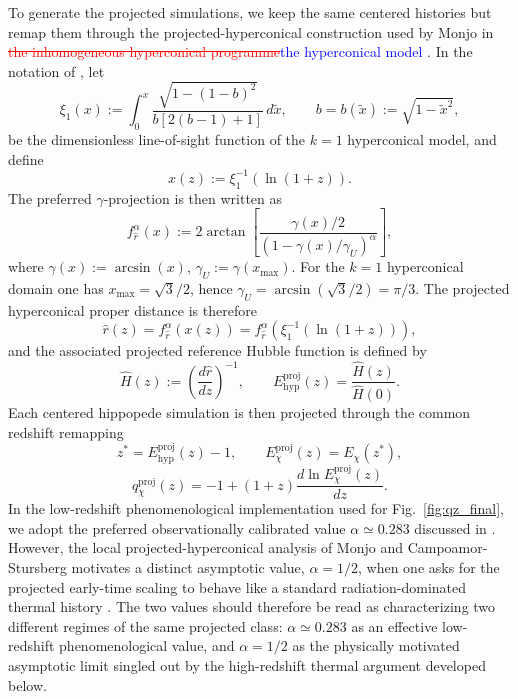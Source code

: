 \documentclass[3p,times,twocolumn]{elsarticle}
\begin{document}
To generate the projected simulations, we keep the same centered histories but remap them through the projected-hyperconical construction used by Monjo in \textcolor{red}{\sout{the inhomogeneous hyperconical programme}}\textcolor{blue}{the hyperconical model} \cite{monjo2017hyperconical, monjo2018projected, monjo2020lagrangian, monjo2023hubble, Monjo_2024}. In the notation of \cite{monjo2018projected}, let
\begin{equation}
\xi_1(x):=\int_{0}^{x}\frac{\sqrt{1-(1-b)^2}}{b\left[2(b-1)+1\right]}\,d\tilde x,
\qquad
b=b(\tilde x):=\sqrt{1-\tilde x^2},
\end{equation}
be the dimensionless line-of-sight function of the $k=1$ hyperconical model, and define
\begin{equation}
x(z):=\xi_1^{-1}(\ln(1+z)).
\end{equation}
The preferred $\gamma$-projection is then written as
\begin{equation}
\label{eq:projection_map}
f_{\hat r}^{\alpha}(x):=
2\arctan\!\left[
\frac{\gamma(x)/2}{\left(1-\gamma(x)/\gamma_U\right)^\alpha}
\right],
\end{equation}
where $\gamma(x):=\arcsin(x)$, $\gamma_U:=\gamma(x_{\max})$. For the $k=1$ hyperconical domain one has $x_{\max}=\sqrt{3}/2$, hence $\gamma_U=\arcsin\!\left(\sqrt{3}/2\right)= \pi/3$. The projected hyperconical proper distance is therefore
\begin{equation}
\hat r(z)= f_{\hat r}^{\alpha}\!\left(x(z)\right)
= f_{\hat r}^{\alpha}\!\left(\xi_1^{-1}(\ln(1+z))\right),
\end{equation}
and the associated projected reference Hubble function is defined by
\begin{equation}
\hat H(z):=\left(\frac{d\hat r}{dz}\right)^{-1},
\qquad
E_{\mathrm{hyp}}^{\mathrm{proj}}(z)=\frac{\hat H(z)}{\hat H(0)}.
\end{equation}
Each centered hippopede simulation is then projected through the common redshift remapping
\begin{equation}
z^*=E_{\mathrm{hyp}}^{\mathrm{proj}}(z)-1,
\qquad
E^{\mathrm{proj}}_\chi(z)=E_\chi(z^*),
\end{equation}
\begin{equation}
q^{\mathrm{proj}}_\chi(z)=-1+(1+z)\frac{d\ln E^{\mathrm{proj}}_\chi(z)}{dz}.
\end{equation}
In the low-redshift phenomenological implementation used for Fig.~\ref{fig:qz_final}, we adopt the preferred observationally calibrated value $\alpha\simeq0.283$ discussed in \cite{monjo2018projected}. However, the local projected-hyperconical analysis of Monjo and Campoamor-Stursberg motivates a distinct asymptotic value, $\alpha=1/2$, when one asks for the projected early-time scaling to behave like a standard radiation-dominated thermal history \cite{monjo2020lagrangian, monjo2023hubble}. The two values should therefore be read as characterizing two different regimes of the same projected class: $\alpha\simeq0.283$ as an effective low-redshift phenomenological value, and $\alpha=1/2$ as the physically motivated asymptotic limit singled out by the high-redshift thermal argument developed below.
\end{document}
